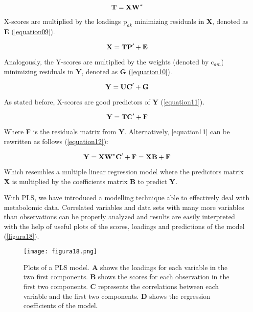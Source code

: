 \begin{equation}
\label{equation08}
\textbf{\text{T}}=\textbf{\text{XW}}^*
\end{equation}

X-scores are multiplied by the loadings $\text{p}_{ak}$ minimizing residuals in \textbf{X}, denoted as \textbf{E} (\autoref{equation09}).

\begin{equation}
\label{equation09}
\textbf{\text{X}}=\textbf{\text{TP}}'+\textbf{\text{E}}
\end{equation}

Analogously, the Y-scores are multiplied by the weights (denoted by $\text{c}_{am}$) minimizing residuals in \textbf{Y}, denoted as \textbf{G} (\autoref{equation10}).

\begin{equation}
\label{equation10}
\textbf{\text{Y}}=\textbf{\text{UC}}'+\textbf{\text{G}}
\end{equation}

As stated before, X-scores are good predictors of \textbf{Y} (\autoref{equation11}).

\begin{equation}
\label{equation11}
\textbf{\text{Y}}=\textbf{\text{TC}}'+\textbf{\text{F}}
\end{equation}

Where \textbf{F} is the residuals matrix from \textbf{Y}. Alternatively, \autoref{equation11} can be rewritten as follows (\autoref{equation12}):

\begin{equation}
\label{equation12}
\textbf{\text{Y}}=\textbf{\text{XW}}^*\textbf{\text{C}}'+\textbf{\text{F}}=\textbf{\text{XB}}+\textbf{\text{F}}
\end{equation}

Which resembles a multiple linear regression model where the predictors matrix \textbf{X} is multiplied by the coefficients matrix \textbf{B} to predict \textbf{Y}.

With PLS, we have introduced a modelling technique able to effectively deal with metabolomic data. Correlated variables and data sets with many more variables than observations can be properly analyzed and results are easily interpreted with the help of useful plots of the scores, loadings and predictions of the model (\autoref{figura18}).

\begin{figure}[hbtp]
	\centering
\texttt{[image: figura18.png]}
\caption[Plots of a PLS model]{Plots of a PLS model. \textbf{A} shows the loadings for each variable in the two first components. \textbf{B} shows the scores for each observation in the first two components. \textbf{C} represents the correlations between each variable and the first two components.  \textbf{D} shows the regression coefficients of the model.}
\label{figura18}
\end{figure}


